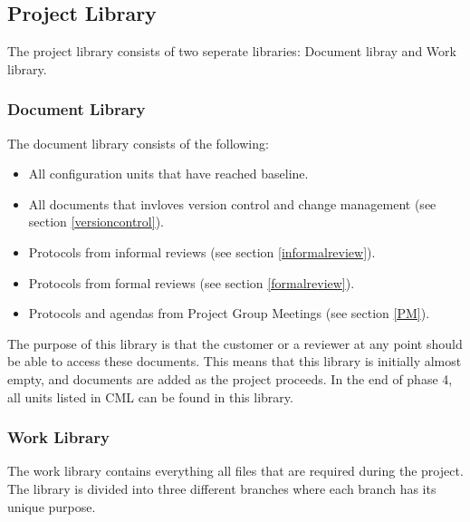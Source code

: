 \documentclass{article}
\begin{document}
    \subsection{Project Library \label{project_library}}
        The project library consists of two seperate libraries: Document libray and Work library.
    
        \subsubsection{Document Library \label{doclibrary}}
            The document library consists of the following:
            
            \begin{itemize}
                \item All configuration units that have reached baseline.
                \item All documents that invloves version control and change management (see                       section \ref{versioncontrol}).
                \item Protocols from informal reviews (see section \ref{informalreview}).
                \item Protocols from formal reviews (see section \ref{formalreview}).
                \item Protocols and agendas from Project Group Meetings (see section \ref{PM}).
            \end{itemize}
            \noindent
            The purpose of this library is that the customer or a reviewer at any point should be able to access these documents. 
            This means that this library is initially almost empty, and documents are added as the project proceeds. In the end of phase 4, all units listed in CML can be found in this library.

            
        \subsubsection{Work Library}
            The work library contains everything all files that are required during the project.
            The library is divided into three different branches where each branch has its unique purpose.
            
\end{document}

